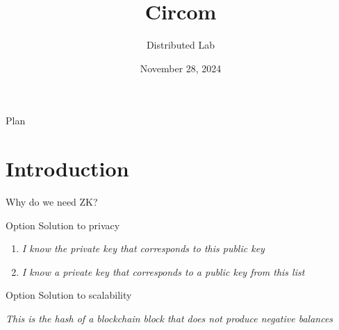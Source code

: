 \documentclass{zkdl-presentation-template}
\title[Circom]{\textbf{Circom}}
\author{Distributed Lab}
\date{November 28, 2024}
\begin{document}

    \begin{frame}{Plan}
        \tableofcontents
    \end{frame}


    \section{Introduction}

    \begin{frame}{Why do we need ZK?}
        \pause

        \begin{block}{Option}
            Solution to privacy
        \end{block}

        \pause

        \begin{example}
            \begin{enumerate}
                \item \textit{I know the private key that corresponds to this public key}
                \item \textit{I know a private key that corresponds to a public key from this list}
            \end{enumerate}
        \end{example}

        \pause

        \begin{block}{Option}
            Solution to scalability
        \end{block}

        \pause

        \begin{example}
            \textit{This is the hash of a blockchain block that does not produce negative balances}
        \end{example}
    \end{frame}
\end{document}
